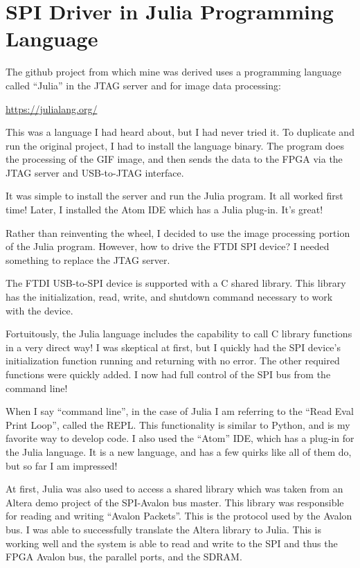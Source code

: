\section{SPI Driver in Julia Programming Language}

The github project from which mine was derived uses a programming language called ``Julia'' in the JTAG server and for image data processing:

\url{https://julialang.org/}

This was a language I had heard about, but I had never tried it.
To duplicate and run the original project, I had to install the language binary.
The program does the processing of the GIF image, and then sends the data to the FPGA
via the JTAG server and USB-to-JTAG interface.

It was simple to install the server and run the Julia program.  It all worked first time!
Later, I installed the Atom IDE which has a Julia plug-in.  It's great!

Rather than reinventing the wheel, I decided to use the image processing portion of the Julia program.
However, how to drive the FTDI SPI device?  I needed something to replace the JTAG server.

The FTDI USB-to-SPI device is supported with a C shared library.  This library has the initialization, read, write, and shutdown
command necessary to work with the device.

Fortuitously, the Julia language includes the capability to call C library functions in a very direct way!
I was skeptical at first, but I quickly had the SPI device's initialization function running and returning with no error.
The other required functions were quickly added.  I now had full control of the SPI bus from the command line!

When I say ``command line'', in the case of Julia I am referring to the ``Read Eval Print Loop'', called the REPL.  This functionality is similar to Python, and is my favorite way to develop code.  I also used the ``Atom'' IDE, which has a plug-in for the Julia language.
It is a new language, and has a few quirks like all of them do, but so far I am impressed!

At first, Julia was also used to access a shared library which was taken from an Altera demo project of the SPI-Avalon bus master.
This library was responsible for reading and writing ``Avalon Packets''.  This is the protocol used by the Avalon bus.  I was able to successfully translate the Altera library to Julia.  This is working well and the system is able to read and write to the SPI and thus the FPGA Avalon bus, the parallel ports, and the SDRAM.

